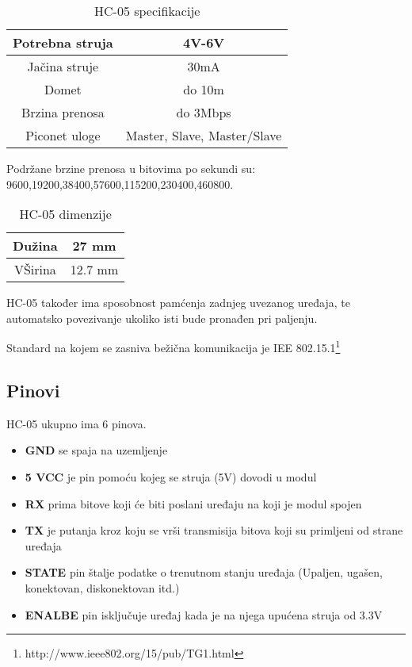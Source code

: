 \documentclass[../Document.tex]{subfiles}
\begin{document}
\vspace{1cm}
\begin{table}[h]
    \centering
    \begin{tabular}{ |c|c| }
        \hline
        Potrebna struja & 4V-6V                       \\
        \hline
        Jačina struje   & 30mA                        \\
        \hline
        Domet           & do 10m                      \\
        \hline
        Brzina prenosa  & do 3Mbps                    \\
        \hline
        Piconet uloge   & Master, Slave, Master/Slave \\
        \hline
    \end{tabular}
    \caption{HC-05 specifikacije}
\end{table}

\noindent Podržane brzine prenosa u bitovima po sekundi su: 9600,19200,38400,57600,115200,230400,460800. \\


\begin{table}[h!]
    \centering
    \begin{tabular}{ |c|c| }
        \hline
        Dužina  & 27 mm   \\
        \hline
        VŠirina & 12.7 mm \\
        \hline
    \end{tabular}
    \caption{HC-05 dimenzije}
\end{table}

\noindent HC-05 također ima sposobnost pamćenja zadnjeg uvezanog uređaja, te automatsko povezivanje ukoliko isti bude pronađen pri paljenju.

\noindent Standard na kojem se zasniva bežična komunikacija je IEE 802.15.1\footnote{http://www.ieee802.org/15/pub/TG1.html}

\subsection{Pinovi}
HC-05 ukupno ima 6 pinova.
\begin{itemize}
    \item\textbf{GND} se spaja na uzemljenje
    \item\textbf{5 VCC} je pin pomoću kojeg se struja (5V) dovodi u modul
    \item\textbf{RX} prima bitove koji će biti poslani uređaju na koji je modul spojen
    \item\textbf{TX} je putanja kroz koju se vrši transmisija bitova koji su primljeni od strane uređaja
    \item\textbf{STATE} pin štalje podatke o trenutnom stanju uređaja (Upaljen, ugašen, konektovan, diskonektovan itd.)
    \item\textbf{ENALBE} pin isključuje uređaj kada je na njega upućena struja od 3.3V
\end{itemize}
\newpage
\end{document}
